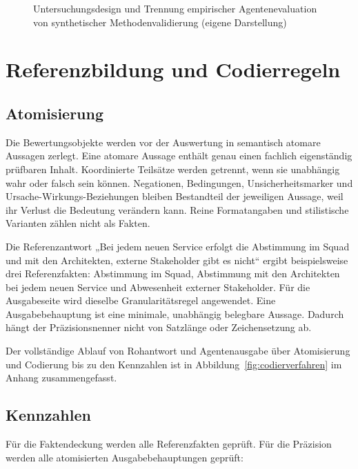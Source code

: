 \documentclass[
  10pt,
  ngerman,
  a4paper,
  toc=graduated,
  numbers=noenddot,
  headings=standardclasses,
  nonumberlist
]{scrartcl}
\begin{document}
\begin{figure}[htbp]
    \centering
    
    \caption{Untersuchungsdesign und Trennung empirischer Agentenevaluation von synthetischer Methodenvalidierung (eigene Darstellung)}
    \label{fig:untersuchungsdesign}
\end{figure}

\section{Referenzbildung und Codierregeln}

\subsection{Atomisierung}

Die Bewertungsobjekte werden vor der Auswertung in semantisch atomare Aussagen zerlegt. Eine atomare Aussage enthält genau einen fachlich eigenständig prüfbaren Inhalt. Koordinierte Teilsätze werden getrennt, wenn sie unabhängig wahr oder falsch sein können. Negationen, Bedingungen, Unsicherheitsmarker und Ursache-Wirkungs-Beziehungen bleiben Bestandteil der jeweiligen Aussage, weil ihr Verlust die Bedeutung verändern kann. Reine Formatangaben und stilistische Varianten zählen nicht als Fakten.

Die Referenzantwort „Bei jedem neuen Service erfolgt die Abstimmung im Squad und mit den Architekten, externe Stakeholder gibt es nicht“ ergibt beispielsweise drei Referenzfakten: Abstimmung im Squad, Abstimmung mit den Architekten bei jedem neuen Service und Abwesenheit externer Stakeholder. Für die Ausgabeseite wird dieselbe Granularitätsregel angewendet. Eine Ausgabebehauptung ist eine minimale, unabhängig belegbare Aussage. Dadurch hängt der Präzisionsnenner nicht von Satzlänge oder Zeichensetzung ab.

Der vollständige Ablauf von Rohantwort und Agentenausgabe über Atomisierung und Codierung bis zu den Kennzahlen ist in Abbildung~\ref{fig:codierverfahren} im Anhang zusammengefasst.

\subsection{Kennzahlen}

Für die Faktendeckung werden alle Referenzfakten geprüft. Für die Präzision werden alle atomisierten Ausgabebehauptungen geprüft:
\end{document}
